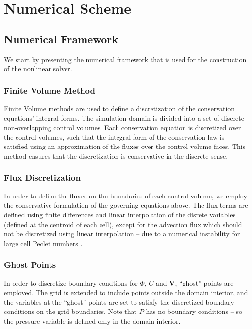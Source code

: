 \documentclass[MSc,beforeExam]{iitcsthesis}
\newcommand\bV{\boldsymbol{V}}
\begin{document}
\chapter{Numerical Scheme} \label{ch:algorithm}

\section{Numerical Framework}

We start by presenting the numerical framework
that is used for the construction of the nonlinear solver.

\subsection{Finite Volume Method}

Finite Volume methods \cite{ferziger2002computational} 
are used to define a discretization of the conservation equations' integral forms.
The simulation domain is divided into a set of discrete non-overlapping control volumes.
Each conservation equation is discretized over the control volumes,
such that the integral form of the conservation law is satisfied using an approximation of the fluxes
over the control volume faces.
This method ensures that the discretization is conservative in the discrete sense.

\subsection{Flux Discretization}

In order to define the fluxes on the boundaries of each control volume, we employ the 
conservative formulation of the governing equations above. 
The flux terms are defined using finite differences and linear interpolation of the disrete 
variables (defined at the centroid of each cell), except for the advection flux which should not be 
discretized using linear interpolation -- due to a numerical instability 
for large cell Peclet numbers \cite{strikwerda2004finite}.

\subsection{Ghost Points}
In order to discretize boundary condtions for $\varPhi$, $C$ and $\bV$, 
``ghost'' points are employed. 
The grid is extended to include points outside the domain interior,
and the variables at the ``ghost'' points are set to satisfy 
the discretized boundary conditions on the grid boundaries.
Note that $P$ has no boundary conditions -- so the pressure variable is defined 
only in the domain interior.
\end{document}
